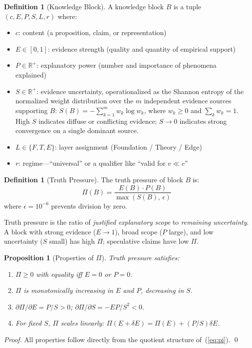 \documentclass[11pt,a4paper]{article}
\newtheorem{proposition}[theorem]{Proposition}
\theoremstyle{definition}
\newtheorem{definition}[theorem]{Definition}
\newcommand{\R}{\mathbb{R}}
\newcommand{\tp}{\Pi}
\begin{document}
\begin{definition}[Knowledge Block]\label{def:block}
A knowledge block $B$ is a tuple $(c, E, P, S, L, r)$ where:
\begin{itemize}[nosep,leftmargin=*]
\item $c$: content (a proposition, claim, or representation)
\item $E \in [0,1]$: evidence strength (quality and quantity of empirical support)
\item $P \in \R^+$: explanatory power (number and importance of phenomena explained)
\item $S \in \R^+$: evidence uncertainty, operationalized as the Shannon entropy of the
  normalized weight distribution over the $m$ independent evidence sources supporting
  $B$: $S(B) = -\sum_{k=1}^{m} w_k \log w_k$, where $w_k \geq 0$ and $\sum_k w_k = 1$.
  High $S$ indicates diffuse or conflicting evidence; $S \to 0$ indicates strong
  convergence on a single dominant source.
\item $L \in \{F, T, E\}$: layer assignment (Foundation / Theory / Edge)
\item $r$: regime---``universal'' or a qualifier like ``valid for $v \ll c$''
\end{itemize}
\end{definition}

\begin{definition}[Truth Pressure]\label{def:pi}
The truth pressure of block $B$ is:
\begin{equation}\label{eq:pi}
\tp(B) = \frac{E(B) \cdot P(B)}{\max(S(B),\, \epsilon)}
\end{equation}
where $\epsilon = 10^{-6}$ prevents division by zero.
\end{definition}

Truth pressure is the ratio of \emph{justified explanatory scope} to \emph{remaining
uncertainty}. A block with strong evidence ($E \to 1$), broad scope ($P$ large), and
low uncertainty ($S$ small) has high $\tp$; speculative claims have low $\tp$.

\begin{proposition}[Properties of $\tp$]\label{prop:pi_props}
Truth pressure satisfies:
\begin{enumerate}[nosep]
\item $\tp \geq 0$ with equality iff $E = 0$ or $P = 0$.
\item $\tp$ is monotonically increasing in $E$ and $P$, decreasing in $S$.
\item $\partial\tp / \partial E = P/S > 0$; $\partial\tp / \partial S = -EP/S^2 < 0$.
\item For fixed $S$, $\tp$ scales linearly: $\tp(E + \delta E) = \tp(E) + (P/S)\delta E$.
\end{enumerate}
\end{proposition}
\begin{proof}
All properties follow directly from the quotient structure of~(\ref{eq:pi}). \qed
\end{proof}
\end{document}
